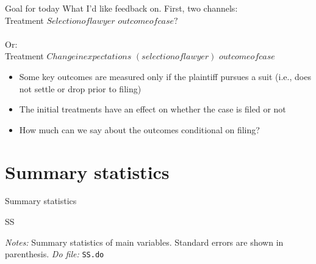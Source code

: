 \documentclass[8pt]{beamer}
\begin{document}
 \begin{frame}{Goal for today}
What I'd like feedback on. First, two channels: \\
\vspace{.1in}
 Treatment \xrightarrow{} $Selection of lawyer$ \xrightarrow{} $outcome of case?$  \\
 
 \pause \\
 \vspace{.1in}
 Or:
 \\
 \vspace{.1in}
    Treatment \xrightarrow{} $Change in expectations$ \xrightarrow{} $(selection of lawyer)$ \xrightarrow{} $outcome of case$

    \pause
    \vspace{.2in}
\begin{itemize}
\item Some key outcomes are measured only if the plaintiff pursues a suit (i.e., does not settle or drop prior to filing)
\item The initial treatments have an effect on whether the case is filed or not
\item How much can we say about the outcomes conditional on filing? 
\end{itemize}

\end{frame}




\section{Summary statistics}

\begin{frame}{Summary statistics}
    \begin{table}[H]
\caption{SS}
\begin{center}
\tiny{}
\end{center}
 \footnotesize
\textit{Notes:} Summary statistics of main variables. Standard errors are shown in parenthesis.   
\textit{Do file: } \texttt{SS.do}
\end{table}
\end{frame}

\end{document}
